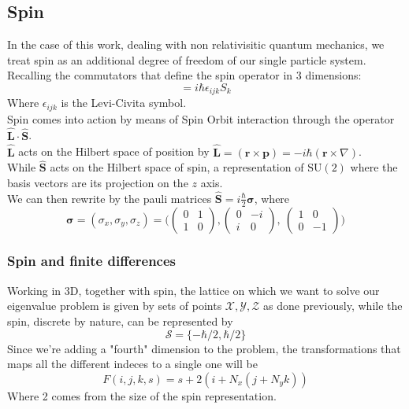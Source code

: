 \subsection{Spin}
In the case of this work, dealing with non relativisitic quantum mechanics, we treat spin as an additional degree of freedom of our single particle system.
\\Recalling the commutators that define the spin operator in 3 dimensions:
\begin{equation}
    [S_i, S_j] = i\hbar \epsilon_{ijk} S_k
\end{equation}
Where $\epsilon_{ijk}$ is the Levi-Civita symbol.
\\Spin comes into action by means of Spin Orbit interaction through the operator $\hat {\mathbf L }\cdot \hat{\mathbf S}$.
\\$\hat{\mathbf{L}}$ acts on the Hilbert space of position by $\hat{\mathbf L} = (\mathbf r \times \mathbf p )= -i\hbar (\mathbf r \times \nabla)$.
\\While $\hat{\mathbf S}$ acts on the Hilbert space of spin, a representation of $\text{SU}(2)$ where the basis vectors are its projection on the $z$ axis.
\\We can then rewrite by the pauli matrices $\hat{\mathbf S} = i\frac \hbar 2 \boldsymbol {\sigma}$, where 
\begin{equation}
    \boldsymbol{\sigma} = (\sigma_x, \sigma_y, \sigma_z) = \bigg( \begin{pmatrix} 0 & 1 \\ 1 & 0 \end{pmatrix}, \begin{pmatrix} 0 & -i \\ i & 0 \end{pmatrix},\ \begin{pmatrix} 1 & 0 \\ 0 & -1 \end{pmatrix} \bigg)
\end{equation}
\subsubsection{Spin and finite differences}
Working in 3D, together with spin, the lattice on which we want to solve our eigenvalue problem is given by sets of points $\mathcal{X}, \mathcal{Y}, \mathcal{Z}$ as done previously, while the spin, discrete by nature, can be represented by 
\begin{equation}
    \mathcal{S} = \{ -\hbar /2, \hbar / 2\}
\end{equation}
Since we're adding a "fourth" dimension to the problem, the transformations that maps all the different indeces to a single one will be
\begin{equation}
    F(i, j, k, s) = s + 2 (i+N_x(j+N_y k))
\end{equation}
Where 2 comes from the size of the spin representation.
